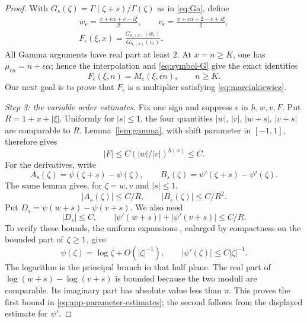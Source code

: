 \documentclass[11pt,a4paper,reqno,backref=page]{amsart}
\let\Re\relax\DeclareMathOperator{\Re}{Re}
\numberwithin{equation}{section}
\theoremstyle{definition}
\theoremstyle{remark}
\begin{document}
\begin{proof}
  With $G_s(\zeta)=\Gamma(\zeta+s)/\Gamma(\zeta)$ as in
  \eqref{eq:Ga}, define
  \begin{equation}\label{eq:app-tail-symbol}
    \begin{gathered}
      w_\epsilon=\frac{x+\epsilon\alpha+c-i\xi}{2},\qquad
      v_\epsilon=\frac{x+\epsilon\alpha+2-c+i\xi}{2},\\
      F_\epsilon(\xi,x)
      =\frac{G_{h_\epsilon(x)}(w_\epsilon)}
        {G_{h_\epsilon(x)}(v_\epsilon)}.
    \end{gathered}
  \end{equation}
  All Gamma arguments have real part at least $2$.
  At $x=n\ge K$, one has
  $\mu_{\epsilon n}=n+\epsilon\alpha$; hence the
  interpolation and \eqref{eq:symbol-G} give the exact
  identities
  \begin{equation}\label{eq:app-tail-identity}
    F_\epsilon(\xi,n)=M_c(\xi,\epsilon n),
    \qquad n\ge K.
  \end{equation}
  Our next goal is to prove that $F_{\epsilon}$ is a multiplier
  satisfying \eqref{eq:marcinkiewicz}.

  \emph{Step 3: the variable order estimates.}
  Fix one sign and suppress $\epsilon$ in $h,w,v,F$.
  Put $R=1+x+|\xi|$. Uniformly for $|s|\le1$,
  the four quantities $|w|$, $|v|$, $|w+s|$, $|v+s|$
  are comparable to $R$. Lemma~\ref{lem:gamma}, with
  shift parameter in $[-1,1]$, therefore gives
  \begin{equation*}
    |F|\le C(|w|/|v|)^{h(x)}\le C.
  \end{equation*}
  For the derivatives, write
  \begin{equation*}
    A_s(\zeta)=\psi(\zeta+s)-\psi(\zeta),\qquad
    B_s(\zeta)=\psi'(\zeta+s)-\psi'(\zeta).
  \end{equation*}
  The same lemma gives, for $\zeta=w,v$ and $|s|\le1$,
  \begin{equation}\label{eq:app-digamma-differences}
    |A_s(\zeta)|\le C/R,\qquad
    |B_s(\zeta)|\le C/R^2.
  \end{equation}
  Put $D_s=\psi(w+s)-\psi(v+s)$. We also need
  \begin{equation}\label{eq:app-parameter-estimates}
    |D_s|\le C,\qquad
    |\psi'(w+s)|+|\psi'(v+s)|\le C/R.
  \end{equation}
  To verify these bounds, the uniform expansions
  \cite[Eqs.~5.11.2, 5.15.8]{NIST}, enlarged by compactness
  on the bounded part of $\Re\zeta\ge1$, give
  \begin{equation*}
    \psi(\zeta)=\log\zeta+O(|\zeta|^{-1}),\qquad
    |\psi'(\zeta)|\le C|\zeta|^{-1}.
  \end{equation*}
  The logarithm is the principal branch in that half plane.
  The real part of $\log(w+s)-\log(v+s)$ is bounded because
  the two moduli are comparable. Its imaginary part has
  absolute value less than $\pi$. This proves the first
  bound in \eqref{eq:app-parameter-estimates}; the second
  follows from the displayed estimate for $\psi'$.
  

\end{proof}
\end{document}

